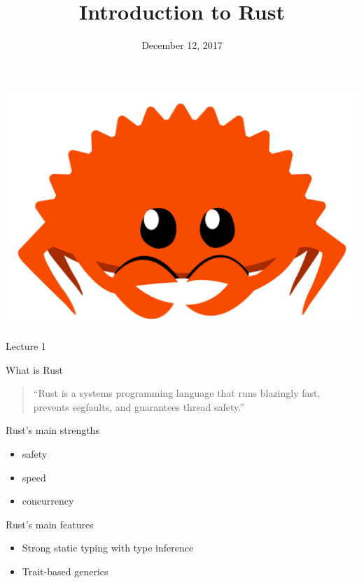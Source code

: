 \documentclass[12pt, aspectratio=169]{beamer}
\title{Introduction to Rust}
\date{December 12, 2017}
\author[@aqrln, @nechaido]{%
  \texorpdfstring{%
    \parbox{0.35\textwidth}{%
      Alexey Orlenko\\
      \href{https://twitter.com/aqrln}{@aqrln}
    }
    \parbox{0.35\textwidth}{%
      Dmytro Nechai\\
      \href{https://twitter.com/nechaido}{@nechaido}
    }
    \vspace{0.6cm}
  }
  {Alexey Orlenko, Dmytro Nechai}
}
\institute{HowProgrammingWorks}
\newcommand{\ferrisframe}[1]{%
  \begin{frame}[standout]
    \includegraphics[height=0.8\textheight]{images/ferris.png}

    #1
  \end{frame}
}
\begin{document}
\maketitle

\ferrisframe{Lecture 1}

\begin{frame}{What is Rust}
  \begin{quote}
    ``Rust is a systems programming language that runs blazingly fast, prevents
    segfaults, and guarantees thread safety.''
  \end{quote}

\end{frame}

\begin{frame}{Rust's main strengths}
  \begin{itemize}
    \item safety
    \item speed
    \item concurrency
  \end{itemize}
\end{frame}

\begin{frame}{Rust's main features}
  \begin{itemize}
    \item Strong static typing with type inference
    \item Trait-based generics
  \end{itemize}
\end{frame}
\end{document}
